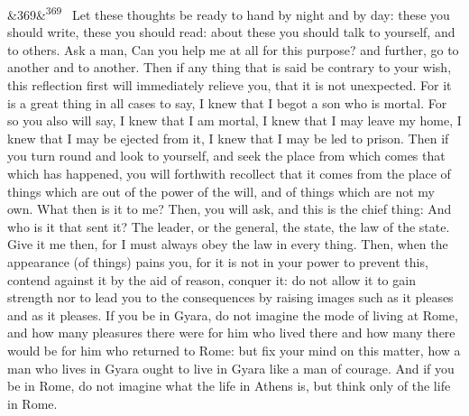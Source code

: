 \documentclass[12pt]{article}
\newcommand{\para}[1][]{\par\noindent\ifx&#1&\else\textsuperscript{\footnotesize #1}~\fi}
\begin{document}
\para[369] Let these thoughts be ready to hand by night and by day: these you should write, these you should read: about these you should talk to yourself, and to others. Ask a man, Can you help me at all for this purpose? and further, go to another and to another. Then if any thing that is said be contrary to your wish, this reflection first will immediately relieve you, that it is not unexpected. For it is a great thing in all cases to say, I knew that I begot a son who is mortal. For so you also will say, I knew that I am mortal, I knew that I may leave my home, I knew that I may be ejected from it, I knew that I may be led to prison. Then if you turn round and look to yourself, and seek the place from which comes that which has happened, you will forthwith recollect that it comes from the place of things which are out of the power of the will, and of things which are not my own. What then is it to me? Then, you will ask, and this is the chief thing: And who is it that sent it? The leader, or the general, the state, the law of the state. Give it me then, for I must always obey the law in every thing. Then, when the appearance (of things) pains you, for it is not in your power to prevent this, contend against it by the aid of reason, conquer it: do not allow it to gain strength nor to lead you to the consequences by raising images such as it pleases and as it pleases. If you be in Gyara, do not imagine the mode of living at Rome, and how many pleasures there were for him who lived there and how many there would be for him who returned to Rome: but fix your mind on this matter, how a man who lives in Gyara ought to live in Gyara like a man of courage. And if you be in Rome, do not imagine what the life in Athens is, but think only of the life in Rome.
\end{document}
